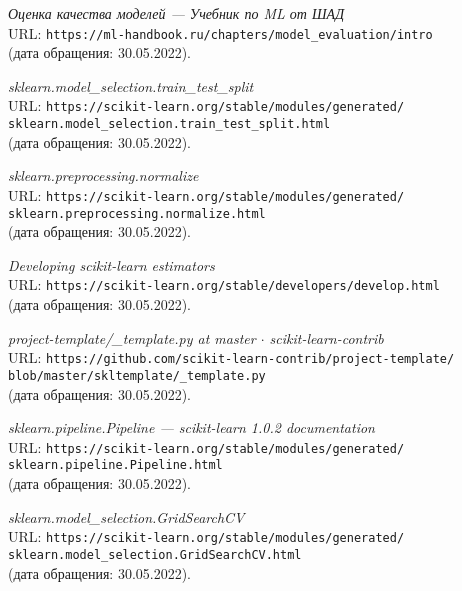 \begin{thebibliography}{99}    
{\itshape Оценка качества моделей --- Учебник по ML от ШАД}\\
URL: \texttt{https://ml-handbook.ru/chapters/model\_evaluation/intro}\\
(дата обращения: 30.05.2022).

{\itshape sklearn.model\_selection.train\_test\_split}\\
URL: \texttt{https://scikit-learn.org/stable/modules/generated/\\sklearn.model\_selection.train\_test\_split.html}\\
(дата обращения: 30.05.2022).

{\itshape sklearn.preprocessing.normalize}\\
URL: \texttt{https://scikit-learn.org/stable/modules/generated/\\sklearn.preprocessing.normalize.html}\\
(дата обращения: 30.05.2022).

{\itshape Developing scikit-learn estimators}\\
URL: \texttt{https://scikit-learn.org/stable/developers/develop.html}\\
(дата обращения: 30.05.2022).

{\itshape project-template/\_template.py at master $\cdot$ scikit-learn-contrib}\\
URL: \texttt{https://github.com/scikit-learn-contrib/project-template/\\blob/master/skltemplate/\_template.py}\\
(дата обращения: 30.05.2022).

{\itshape sklearn.pipeline.Pipeline --- scikit-learn 1.0.2 documentation}\\
URL: \texttt{https://scikit-learn.org/stable/modules/generated/\\sklearn.pipeline.Pipeline.html}\\
(дата обращения: 30.05.2022).

{\itshape sklearn.model\_selection.GridSearchCV}\\
URL: \texttt{https://scikit-learn.org/stable/modules/generated/\\sklearn.model\_selection.GridSearchCV.html}\\
(дата обращения: 30.05.2022).


\end{thebibliography}
